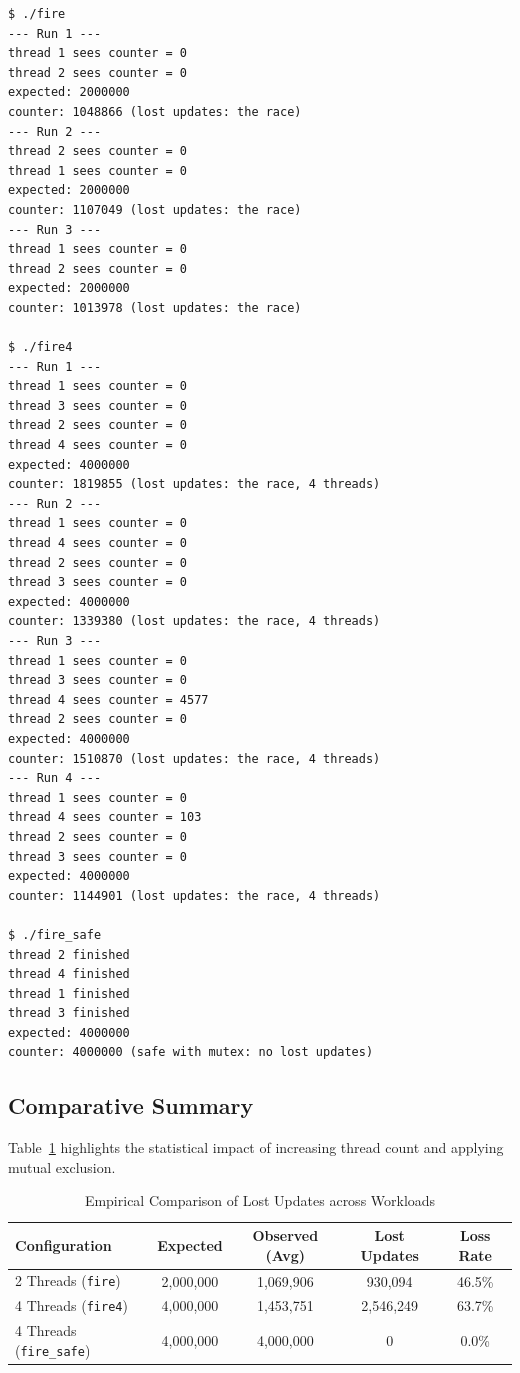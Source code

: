 \documentclass[12pt,a4paper]{article}
\begin{document}
\begin{lstlisting}[style=consolestyle, caption={Benchmark Execution Log}]
$ ./fire
--- Run 1 ---
thread 1 sees counter = 0
thread 2 sees counter = 0
expected: 2000000
counter: 1048866 (lost updates: the race)
--- Run 2 ---
thread 2 sees counter = 0
thread 1 sees counter = 0
expected: 2000000
counter: 1107049 (lost updates: the race)
--- Run 3 ---
thread 1 sees counter = 0
thread 2 sees counter = 0
expected: 2000000
counter: 1013978 (lost updates: the race)

$ ./fire4
--- Run 1 ---
thread 1 sees counter = 0
thread 3 sees counter = 0
thread 2 sees counter = 0
thread 4 sees counter = 0
expected: 4000000
counter: 1819855 (lost updates: the race, 4 threads)
--- Run 2 ---
thread 1 sees counter = 0
thread 4 sees counter = 0
thread 2 sees counter = 0
thread 3 sees counter = 0
expected: 4000000
counter: 1339380 (lost updates: the race, 4 threads)
--- Run 3 ---
thread 1 sees counter = 0
thread 3 sees counter = 0
thread 4 sees counter = 4577
thread 2 sees counter = 0
expected: 4000000
counter: 1510870 (lost updates: the race, 4 threads)
--- Run 4 ---
thread 1 sees counter = 0
thread 4 sees counter = 103
thread 2 sees counter = 0
thread 3 sees counter = 0
expected: 4000000
counter: 1144901 (lost updates: the race, 4 threads)

$ ./fire_safe
thread 2 finished
thread 4 finished
thread 1 finished
thread 3 finished
expected: 4000000
counter: 4000000 (safe with mutex: no lost updates)
\end{lstlisting}

\subsection{Comparative Summary}
Table~\ref{tab:comparison} highlights the statistical impact of increasing thread count and applying mutual exclusion.

\begin{table}[H]
\centering
\small
\begin{tabularx}{\textwidth}{lcccc}
\toprule
\textbf{Configuration} & \textbf{Expected} & \textbf{Observed (Avg)} & \textbf{Lost Updates} & \textbf{Loss Rate} \\
\midrule
2 Threads (\texttt{fire}) & 2,000,000 & 1,069,906 & 930,094 & 46.5\% \\
4 Threads (\texttt{fire4}) & 4,000,000 & 1,453,751 & 2,546,249 & 63.7\% \\
4 Threads (\texttt{fire\_safe}) & 4,000,000 & 4,000,000 & 0 & 0.0\% \\
\bottomrule
\end{tabularx}
\caption{Empirical Comparison of Lost Updates across Workloads}
\label{tab:comparison}
\end{table}
\end{document}
